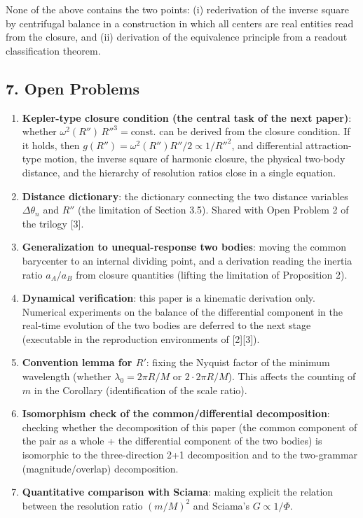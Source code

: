 \documentclass[
  a4paper,
]{article}
\providecommand{\tightlist}{%
  \setlength{\itemsep}{0pt}\setlength{\parskip}{0pt}}
\begin{document}
None of the above contains the two points: (i) rederivation of the
inverse square by centrifugal balance in a construction in which all
centers are real entities read from the closure, and (ii) derivation of
the equivalence principle from a readout classification theorem.

\subsection{7. Open Problems}\label{open-problems}

\begin{enumerate}
\def\labelenumi{\arabic{enumi}.}
\tightlist
\item
  \textbf{Kepler-type closure condition (the central task of the next
  paper)}: whether \(\omega^2(R'')\,R''^3=\text{const.}\) can be derived
  from the closure condition. If it holds, then
  \(g(R'')=\omega^2(R'')R''/2\propto1/R''^2\), and differential
  attraction-type motion, the inverse square of harmonic closure, the
  physical two-body distance, and the hierarchy of resolution ratios
  close in a single equation.
\item
  \textbf{Distance dictionary}: the dictionary connecting the two
  distance variables \(\Delta\theta_n\) and \(R''\) (the limitation of
  Section 3.5). Shared with Open Problem 2 of the trilogy {[}3{]}.
\item
  \textbf{Generalization to unequal-response two bodies}: moving the
  common barycenter to an internal dividing point, and a derivation
  reading the inertia ratio \(a_A/a_B\) from closure quantities (lifting
  the limitation of Proposition 2).
\item
  \textbf{Dynamical verification}: this paper is a kinematic derivation
  only. Numerical experiments on the balance of the differential
  component in the real-time evolution of the two bodies are deferred to
  the next stage (executable in the reproduction environments of
  {[}2{]}{[}3{]}).
\item
  \textbf{Convention lemma for \(R'\)}: fixing the Nyquist factor of the
  minimum wavelength (whether \(\lambda_0=2\pi R/M\) or
  \(2\cdot2\pi R/M\)). This affects the counting of \(m\) in the
  Corollary (identification of the scale ratio).
\item
  \textbf{Isomorphism check of the common/differential decomposition}:
  checking whether the decomposition of this paper (the common component
  of the pair as a whole + the differential component of the two bodies)
  is isomorphic to the three-direction 2+1 decomposition and to the
  two-grammar (magnitude/overlap) decomposition.
\item
  \textbf{Quantitative comparison with Sciama}: making explicit the
  relation between the resolution ratio \((m/M)^2\) and Sciama's
  \(G\propto1/\Phi\).
\end{enumerate}
\end{document}
